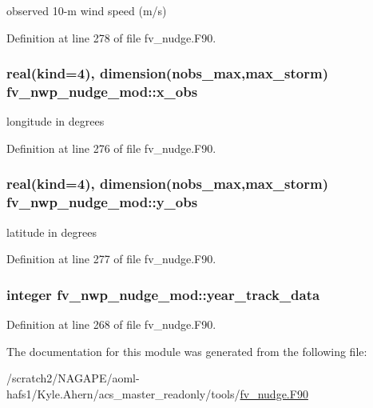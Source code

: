 observed 10-\/m wind speed (m/s) 



Definition at line 278 of file fv\-\_\-nudge.\-F90.

\subsubsection[{x\-\_\-obs}]{\setlength{\rightskip}{0pt plus 5cm}real(kind=4), dimension({\bf nobs\-\_\-max},{\bf max\-\_\-storm}) fv\-\_\-nwp\-\_\-nudge\-\_\-mod\-::x\-\_\-obs\hspace{0.3cm}{\ttfamily [private]}}\label{classfv__nwp__nudge__mod_a9f06e5f833a9b261ab86ddaade7f3571}


longitude in degrees 



Definition at line 276 of file fv\-\_\-nudge.\-F90.

\subsubsection[{y\-\_\-obs}]{\setlength{\rightskip}{0pt plus 5cm}real(kind=4), dimension({\bf nobs\-\_\-max},{\bf max\-\_\-storm}) fv\-\_\-nwp\-\_\-nudge\-\_\-mod\-::y\-\_\-obs\hspace{0.3cm}{\ttfamily [private]}}\label{classfv__nwp__nudge__mod_aecc8732e077061904bbf9f1e052c190d}


latitude in degrees 



Definition at line 277 of file fv\-\_\-nudge.\-F90.

\subsubsection[{year\-\_\-track\-\_\-data}]{\setlength{\rightskip}{0pt plus 5cm}integer fv\-\_\-nwp\-\_\-nudge\-\_\-mod\-::year\-\_\-track\-\_\-data\hspace{0.3cm}{\ttfamily [private]}}\label{classfv__nwp__nudge__mod_a9171eb4f9d03ed8a5648ba241620df1c}


Definition at line 268 of file fv\-\_\-nudge.\-F90.



The documentation for this module was generated from the following file\-:\begin{DoxyCompactItemize}
\item 
/scratch2/\-N\-A\-G\-A\-P\-E/aoml-\/hafs1/\-Kyle.\-Ahern/acs\-\_\-master\-\_\-readonly/tools/\hyperlink{fv__nudge_8F90}{fv\-\_\-nudge.\-F90}\end{DoxyCompactItemize}
